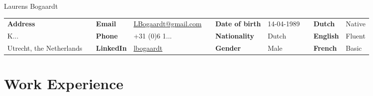 \documentclass[a4paper,8pt]{extarticle}
\begin{document}
\begin{bf}
\begin{center}
\begin{Huge}
Laurens Bogaardt
\end{Huge}
\end{center}
\end{bf}

\vspace{2mm}

\begin{center}
\setlength{\tabcolsep}{0mm}
\begin{tabular}{p{}p{}p{}p{}<{\raggedleft}p{}p{}p{}<{\raggedleft}p{}p{}p{}<{\raggedleft}}
\textbf{Address}&&\textbf{Email}&\href{mailto:lbogaardt@gmail.com}{LBogaardt@gmail.com}&&\textbf{Date of birth}&14-04-1989&&\textbf{Dutch}&Native\\
K... &&\textbf{Phone}&+31 (0)6 1...&&\textbf{Nationality}&Dutch&&\textbf{English}&Fluent\\
Utrecht, the Netherlands&&\textbf{LinkedIn}&\href{https://www.linkedin.com/in/lbogaardt}{lbogaardt}&&\textbf{Gender}&Male&&\textbf{French}&Basic 
\end{tabular}
\end{center}

\vspace{2mm}

\section*{Work Experience}
\end{document}
